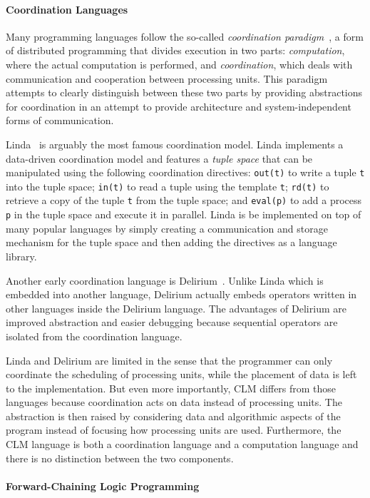 \paragraph{Coordination Languages}
Many programming languages follow the so-called \emph{coordination
paradigm}~\cite{Papadopoulos98coordinationmodels}, a form of distributed
programming that divides execution in two parts: \emph{computation}, where the actual
computation is performed, and \emph{coordination}, which deals with
communication and cooperation between processing units. This paradigm attempts
to clearly distinguish between these two parts by providing abstractions for
coordination in an attempt to provide architecture and system-independent forms
of communication.  

Linda~\cite{linda} is arguably the most famous coordination model. Linda
implements a data-driven coordination model and features a \emph{tuple space}
that can be manipulated using the following coordination directives:
\texttt{out(t)} to write a tuple \texttt{t} into the tuple space; \texttt{in(t)}
to read a tuple using the template \texttt{t}; \texttt{rd(t)} to retrieve a copy
of the tuple \texttt{t} from the tuple space; and \texttt{eval(p)} to add a
process \texttt{p} in the tuple space and execute it in parallel.  Linda is be
implemented on top of many popular languages by simply creating a communication
and storage mechanism for the tuple space and then adding the directives as a
language library.

Another early coordination language is Delirium~\cite{Delirium}. Unlike Linda
which is embedded into another language, Delirium actually embeds operators
written in other languages inside the Delirium language.  The advantages of
Delirium are improved abstraction and easier debugging because sequential
operators are isolated from the coordination language.

Linda and Delirium are limited in the sense that the programmer can only
coordinate the scheduling of processing units, while the placement of data is
left to the implementation. But even more importantly, CLM differs from those
languages because coordination acts on data instead of processing units.
The abstraction is then raised by considering data and algorithmic aspects of
the program instead of focusing how processing units are used.
Furthermore, the CLM language is both a coordination language and a computation
language and there is no distinction between the two components.

\paragraph{Forward-Chaining Logic Programming}


